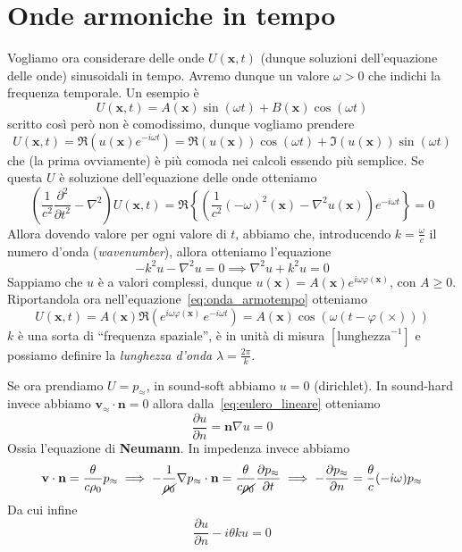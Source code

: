 \section{Onde armoniche in tempo}
Vogliamo ora considerare delle onde \(U{(\mathbf{x} , t)}\) (dunque soluzioni
dell'equazione delle onde) sinusoidali in tempo. Avremo dunque un valore
\(\omega > 0\) che indichi la frequenza temporale. Un esempio è
\begin{equation*}
  U{(\mathbf{x} , t)} = A{(\mathbf{x} )} \sin{(\omega t)} + B{(\mathbf{x} )}
  \cos{(\omega t)}
\end{equation*}
scritto così però non è comodissimo, dunque vogliamo prendere 
\begin{equation}\label{eq:onda_armotempo}
    U{(\mathbf{x} , t)} = \Re {\left( u{(\mathbf{x} )} e^{-i\omega t} \right)} =
  \Re {(u{(\mathbf{x} )})} \cos{(\omega t)} + \Im {(u{(\mathbf{x} )})} \sin
  {(\omega t)}
\end{equation}
che (la prima ovviamente) è più comoda nei calcoli essendo più semplice. Se
questa \(U\) è soluzione dell'equazione delle onde otteniamo
\[
  {\left( \frac{1}{c^2} \frac{\partial ^2}{\partial t ^2} - \nabla ^2 \right)}
  U{(\mathbf{x} , t)} = \Re \left\{ {\left( \frac{1}{c^2}{(-\omega)}^2 {(\mathbf{x} )}
  - \nabla ^2 u{(\mathbf{x} )}\right)} e^{-i\omega t} \right\} = 0
\]
Allora dovendo valore per ogni valore di \(t\), abbiamo che, introducendo \(k =
\frac{\omega}{c}\) il numero d'onda (\emph{wavenumber}), allora otteniamo
l'equazione
\begin{equation}\label{eq:helmholtz}
  -k^2 u - \nabla ^2 u = 0 \implies \nabla ^2 u + k^2 u = 0
\end{equation}
Sappiamo che \(u\) è a valori complessi, dunque \(u{(\mathbf{x} )} =
A{(\mathbf{x} )} e ^{i \omega \varphi {(\mathbf{x} )}}\), con \(A \ge 0\).
Riportandola ora nell'equazione~\eqref{eq:onda_armotempo} otteniamo
\[
  U{(\mathbf{x} , t)} = A{(\mathbf{x} )} \Re {\left( e^{i\omega \varphi
  {(\mathbf{x} )}} \, e^{-i \omega t} \right)} = A{(\mathbf{x} )} \cos{(\omega
{( t - \varphi {(\times )})})}
\]
\(k\) è una sorta di ``frequenza spaziale'', è in unità di misura
\([\text{lunghezza}^{-1}]\) e possiamo definire la \emph{lunghezza d'onda}
\(\lambda = \frac{2\pi}{k}\).

Se ora prendiamo \(U = p_\approx\), in sound-soft abbiamo \(u = 0\)
(dirichlet). In sound-hard invece abbiamo \(\mathbf{v}_\approx \cdot \mathbf{n}
= 0\) allora dalla~\eqref{eq:eulero_lineare} otteniamo
\begin{equation}\label{eq:neumann}
  \frac{\partial u}{\partial n} = \mathbf{n} \nabla u = 0
\end{equation}
Ossia l'equazione di \textbf{Neumann}. In impedenza invece abbiamo 
\[
  \mathbf{v}  \cdot  \mathbf{n} = \frac{\theta}{c \rho_{0}} p_\approx \implies
  -\frac{1}{\cancel{\rho_{0}}}\nabla p_\approx \cdot \mathbf{n} = \frac{\theta}{c
  \cancel{\rho_{0}}} \frac{\partial p_\approx}{\partial t} \implies  - \frac{\partial
p_\approx}{\partial n} = \frac{\theta}{c} {(-i\omega)}p_\approx 
\]
Da cui infine
\begin{equation}\label{eq:helmholz_impedenza}
  \frac{\partial u}{\partial n} - i\theta k u = 0
\end{equation}

